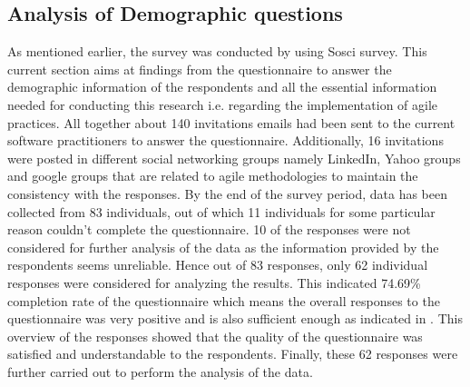 \documentclass[a4paper,oneside]{bth}
\begin{document}
\subsection{Analysis of Demographic questions}
As mentioned earlier, the survey was conducted by using Sosci survey. This current section aims at findings from the questionnaire to answer the demographic information of the respondents and all the essential information needed for conducting this research i.e. regarding the implementation of agile practices. All together about 140 invitations emails had been sent to the current software practitioners to answer the questionnaire. Additionally, 16 invitations were posted in different social networking groups namely LinkedIn, Yahoo groups and google groups that are related to agile methodologies to maintain the consistency with the responses. By the end of the survey period, data has been collected from 83 individuals, out of which 11 individuals for some particular reason couldn’t complete the questionnaire. 10 of the responses were not considered for further analysis of the data as the information provided by the respondents seems unreliable. Hence out of 83 responses, only 62 individual responses were considered for analyzing the results. This indicated 74.69\% completion rate of the questionnaire which means the overall responses to the questionnaire was very positive and is also sufficient enough as indicated in \cite{fink_how_1995}. This overview of the responses showed that the quality of the questionnaire was satisfied and understandable to the respondents. Finally, these 62 responses were further carried out to perform the analysis of the data.
\end{document}
